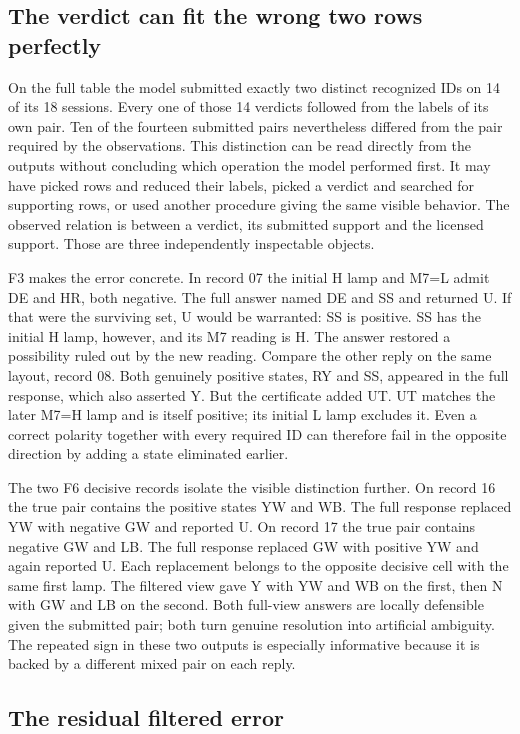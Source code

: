 \documentclass[12pt,letterpaper]{article}
\begin{document}
\subsection{The verdict can fit the wrong two rows perfectly}

On the full table the model submitted exactly two distinct recognized IDs on 14 of its 18 sessions. Every one of those 14 verdicts followed from the labels of its own pair. Ten of the fourteen submitted pairs nevertheless differed from the pair required by the observations. This distinction can be read directly from the outputs without concluding which operation the model performed first. It may have picked rows and reduced their labels, picked a verdict and searched for supporting rows, or used another procedure giving the same visible behavior. The observed relation is between a verdict, its submitted support and the licensed support. Those are three independently inspectable objects.

F3 makes the error concrete. In record 07 the initial H lamp and M7=L admit DE and HR, both negative. The full answer named DE and SS and returned U. If that were the surviving set, U would be warranted: SS is positive. SS has the initial H lamp, however, and its M7 reading is H. The answer restored a possibility ruled out by the new reading. Compare the other reply on the same layout, record 08. Both genuinely positive states, RY and SS, appeared in the full response, which also asserted Y. But the certificate added UT. UT matches the later M7=H lamp and is itself positive; its initial L lamp excludes it. Even a correct polarity together with every required ID can therefore fail in the opposite direction by adding a state eliminated earlier.

The two F6 decisive records isolate the visible distinction further. On record 16 the true pair contains the positive states YW and WB. The full response replaced YW with negative GW and reported U. On record 17 the true pair contains negative GW and LB. The full response replaced GW with positive YW and again reported U. Each replacement belongs to the opposite decisive cell with the same first lamp. The filtered view gave Y with YW and WB on the first, then N with GW and LB on the second. Both full-view answers are locally defensible given the submitted pair; both turn genuine resolution into artificial ambiguity. The repeated sign in these two outputs is especially informative because it is backed by a different mixed pair on each reply.

\subsection{The residual filtered error}
\end{document}
